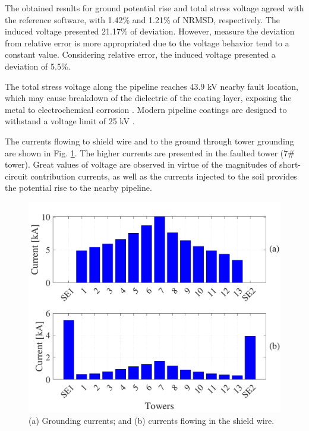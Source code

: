 \documentclass{IEEEtran4PSCC}
\begin{document}
The obtained results for ground potential rise and total stress voltage agreed with the reference software, with 1.42\% and 1.21\% of NRMSD, respectively. The induced voltage presented 21.17\% of deviation. However, measure the deviation from relative error is more appropriated due to the voltage behavior tend to a constant value. Considering relative error, the induced voltage presented a deviation of 5.5\%.

The total stress voltage along the pipeline reaches 43.9 kV nearby fault location, which may cause breakdown of the dielectric of the coating layer, exposing the metal to electrochemical corrosion \cite{NACEInternational2007}. Modern pipeline coatings are designed to withstand a voltage limit of 25 kV \cite{NACEInternational2007}.

The currents flowing to shield wire and to the ground through tower grounding are shown in Fig. \ref{fig:Faultcurrent}. The higher currents are presented in the faulted tower (7\# tower). Great values of voltage are observed in virtue of the magnitudes of short-circuit contribution currents, as well as the currents injected to the soil provides the potential rise to the nearby pipeline.   

\begin{figure}[hbt]
	\begin{center}
		\includegraphics[width=1\columnwidth]{./fig/Fault_current.pdf}
		\caption{(a) Grounding currents; and (b) currents flowing in the shield wire.}
		\label{fig:Faultcurrent}
	\end{center}
\end{figure}
\end{document}
